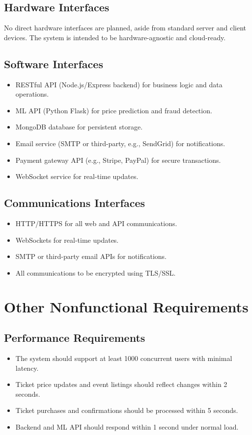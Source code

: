\documentclass[11pt,a4paper]{article}
\begin{document}
\subsection{Hardware Interfaces}
No direct hardware interfaces are planned, aside from standard server and client devices. The system is intended to be hardware-agnostic and cloud-ready.

\subsection{Software Interfaces}
\begin{itemize}
    \item RESTful API (Node.js/Express backend) for business logic and data operations.
    \item ML API (Python Flask) for price prediction and fraud detection.
    \item MongoDB database for persistent storage.
    \item Email service (SMTP or third-party, e.g., SendGrid) for notifications.
    \item Payment gateway API (e.g., Stripe, PayPal) for secure transactions.
    \item WebSocket service for real-time updates.
\end{itemize}

\subsection{Communications Interfaces}
\begin{itemize}
    \item HTTP/HTTPS for all web and API communications.
    \item WebSockets for real-time updates.
    \item SMTP or third-party email APIs for notifications.
    \item All communications to be encrypted using TLS/SSL.
\end{itemize}

\section{Other Nonfunctional Requirements}

\subsection{Performance Requirements}
\begin{itemize}
    \item The system should support at least 1000 concurrent users with minimal latency.
    \item Ticket price updates and event listings should reflect changes within 2 seconds.
    \item Ticket purchases and confirmations should be processed within 5 seconds.
    \item Backend and ML API should respond within 1 second under normal load.
\end{itemize}
\end{document}
